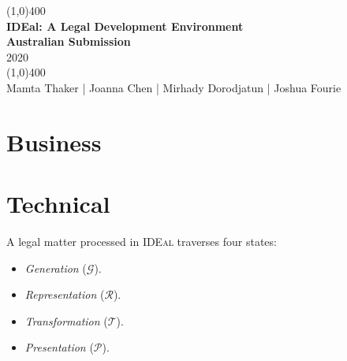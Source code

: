 \documentclass{article}
\date{\today}
\numberwithin{equation}{section}
\newcommand{\ideal}{\textsc{IDEal }}
\begin{document}
	\pagecolor{IdealColour}

	\begin{titlepage}
	\begin{center}
		\color{white}
		\vfill
		\line(1,0){400}\\[1mm]
			\huge{\textbf{IDEal: A Legal Development Environment}}\\
			\Large{\textbf{Australian Submission}}\\
			2020 \\
		\line(1,0){400}\\[3mm]
		\vfill
		\large{Mamta Thaker | Joanna Chen | Mirhady Dorodjatun | Joshua Fourie}
	\end{center}
	\end{titlepage}

	\pagecolor{white}

	\tableofcontents
	\thispagestyle{empty}
	\clearpage

\part{Business}


\pagebreak
\part{Technical}

A legal matter processed in \ideal traverses four states:
\begin{itemize}
	\item \textit{Generation} ($\mathcal{G}$). 
	\item \textit{Representation} ($\mathcal{R}$).
	\item \textit{Transformation} ($\mathcal{T}$). 
	\item \textit{Presentation} ($\mathcal{P}$).
\end{itemize}
	
\end{document}

